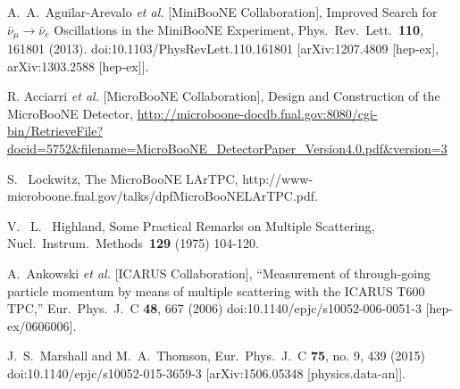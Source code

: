 \documentclass[a4paper,11pt]{article}
\begin{document}
\begin{thebibliography}{99}




  A.~A.~Aguilar-Arevalo {\it et al.} 
  [MiniBooNE Collaboration],
  Improved Search for $\bar \nu_\mu \rightarrow \bar \nu_e$ Oscillations in the MiniBooNE Experiment,
  Phys.\ Rev.\ Lett.\  {\bf 110}, 161801 (2013).
  doi:10.1103/PhysRevLett.110.161801
  [arXiv:1207.4809 [hep-ex], arXiv:1303.2588 [hep-ex]].

  R. Acciarri {\it et al.}
  [MicroBooNE Collaboration],
  Design and Construction of the MicroBooNE Detector,
  \url{http://microboone-docdb.fnal.gov:8080/cgi-bin/RetrieveFile?docid=5752&filename=MicroBooNE_DetectorPaper_Version4.0.pdf&version=3}

  S. ~Lockwitz, 
  The MicroBooNE LArTPC,
  http://www-microboone.fnal.gov/talks/dpfMicroBooNELArTPC.pdf.

  V. ~L. ~Highland, 
  Some Practical Remarks on Multiple Scattering, 
  Nucl.\ Instrum.\ Methods\ {\bf 129} (1975)
  104-120.
 
  A.~Ankowski {\it et al.} [ICARUS Collaboration],
  ``Measurement of through-going particle momentum by means of multiple scattering with the ICARUS T600 TPC,''
  Eur.\ Phys.\ J.\ C {\bf 48}, 667 (2006)
  doi:10.1140/epjc/s10052-006-0051-3
  [hep-ex/0606006].




  J.~S.~Marshall and M.~A.~Thomson,
  Eur.\ Phys.\ J.\ C {\bf 75}, no. 9, 439 (2015)
  doi:10.1140/epjc/s10052-015-3659-3
  [arXiv:1506.05348 [physics.data-an]].


\end{thebibliography}
\end{document}
